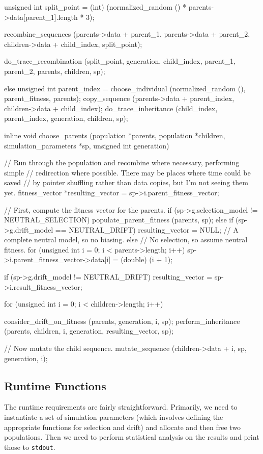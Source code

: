 \documentclass{article}
\begin{document}
\begin{ccode}
{{    unsigned int split_point = (int)
      (normalized_random () * parents->data[parent_1].length * 3);

    recombine_sequences (parents->data + parent_1,
			 parents->data + parent_2,
			 children->data + child_index,
			 split_point);

    do_trace_recombination (split_point, generation, child_index, parent_1,
			    parent_2, parents, children, sp);
  } else {
    unsigned int parent_index = choose_individual (normalized_random (), parent_fitness, parents);
    copy_sequence (parents->data + parent_index, children->data + child_index);
    do_trace_inheritance (child_index, parent_index, generation, children, sp);
  }
}

inline void choose_parents (population *parents, population *children,
			    simulation_parameters *sp, unsigned int generation) {
  // Run through the population and recombine where necessary, performing simple
  // redirection where possible. There may be places where time could be saved
  // by pointer shuffling rather than data copies, but I'm not seeing them yet.
  fitness_vector *resulting_vector = sp->i.parent_fitness_vector;

  // First, compute the fitness vector for the parents.
  if (sp->g.selection_model != NEUTRAL_SELECTION)
    populate_parent_fitness (parents, sp);
  else if (sp->g.drift_model == NEUTRAL_DRIFT)
    resulting_vector = NULL; // A complete neutral model, so no biasing.
  else
    // No selection, so assume neutral fitness.
    for (unsigned int i = 0; i < parents->length; i++)
      sp->i.parent_fitness_vector->data[i] = (double) (i + 1);

  if (sp->g.drift_model != NEUTRAL_DRIFT)
    resulting_vector = sp->i.result_fitness_vector;

  for (unsigned int i = 0; i < children->length; i++) {
    consider_drift_on_fitness (parents, generation, i, sp);
    perform_inheritance (parents, children, i, generation, resulting_vector, sp);

    // Now mutate the child sequence.
    mutate_sequence (children->data + i, sp, generation, i);
  }
}
\end{ccode}

    \subsection{Runtime Functions}

      The runtime requirements are fairly straightforward. Primarily, we need to
      instantiate a set of simulation parameters (which involves defining the
	  appropriate functions for selection and drift) and allocate and then
      free two populations. Then we need to perform statistical analysis on the
      results and print those to \verb|stdout|.
\end{document}
